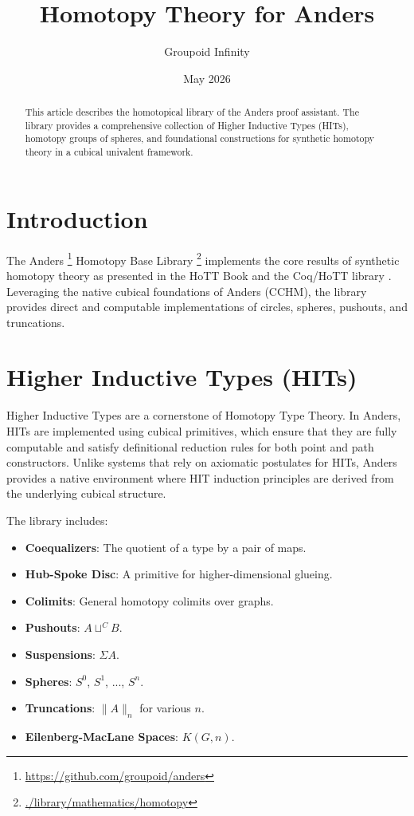 \documentclass[11pt]{article}
\title{Homotopy Theory for Anders}
\author{Groupoid Infinity}
\date{May 2026}
\begin{document}
\maketitle

\begin{abstract}
This article describes the homotopical library of the Anders proof assistant.
The library provides a comprehensive collection of Higher Inductive Types (HITs),
homotopy groups of spheres, and foundational constructions for synthetic homotopy theory
in a cubical univalent framework.
\end{abstract}

\newpage
\tableofcontents

\newpage
\section{Introduction}

The Anders \footnote{\url{https://github.com/groupoid/anders}} Homotopy Base Library
\footnote{\url{./library/mathematics/homotopy}} implements the core results of synthetic
homotopy theory as presented in the HoTT Book \cite{hottbook} and the Coq/HoTT library \cite{bauer2016}. Leveraging the native
cubical foundations of Anders (CCHM), the library provides direct and computable
implementations of circles, spheres, pushouts, and truncations.

\section{Higher Inductive Types (HITs)}

Higher Inductive Types are a cornerstone of Homotopy Type Theory. In Anders, HITs are implemented
using cubical primitives, which ensure that they are fully computable and satisfy definitional
reduction rules for both point and path constructors. Unlike systems that rely on axiomatic
postulates for HITs, Anders provides a native environment where HIT induction principles
are derived from the underlying cubical structure.

The library includes:
\begin{itemize}
    \item \textbf{Coequalizers}: The quotient of a type by a pair of maps.
    \item \textbf{Hub-Spoke Disc}: A primitive for higher-dimensional glueing.
    \item \textbf{Colimits}: General homotopy colimits over graphs.
    \item \textbf{Pushouts}: $A \sqcup^C B$.
    \item \textbf{Suspensions}: $\Sigma A$.
    \item \textbf{Spheres}: $S^0$, $S^1$, ..., $S^n$.
    \item \textbf{Truncations}: $\| A \|_n$ for various $n$.
    \item \textbf{Eilenberg-MacLane Spaces}: $K(G, n)$.
\end{itemize}
\end{document}
